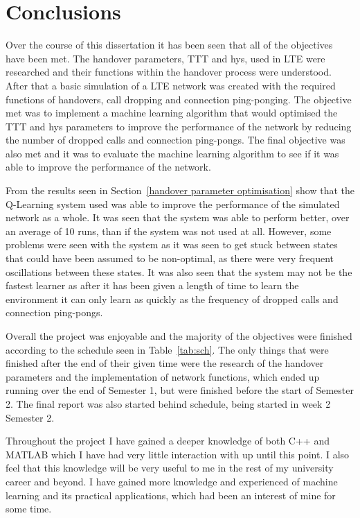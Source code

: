 \chapter{Conclusions}\label{conclusion}
Over the course of this dissertation it has been seen that all of the objectives have been met. The handover parameters, TTT and hys, used in LTE were researched and their functions within the handover process were understood. After that a basic simulation of a LTE network was created with the required functions of handovers, call dropping and connection ping-ponging. The objective met was to implement a machine learning algorithm that would optimised the TTT and hys parameters to improve the performance of the network by reducing the number of dropped calls and connection ping-pongs. The final objective was also met and it was to evaluate the machine learning algorithm to see if it was able to improve the performance of the network.

From the results seen in Section~\ref{handover parameter optimisation} show that the Q-Learning system used was able to improve the performance of the simulated network as a whole. It was seen that the system was able to perform better, over an average of 10 runs, than if the system was not used at all. However, some problems were seen with the system as it was seen to get stuck between states that could have been assumed to be non-optimal, as there were very frequent oscillations between these states. It was also seen that the system may not be the fastest learner as after it has been given a length of time to learn the environment it can only learn as quickly as the frequency of dropped calls and connection ping-pongs.

Overall the project was enjoyable and the majority of the objectives were finished according to the schedule seen in Table~\ref{tab:sch}. The only things that were finished after the end of their given time were the research of the handover parameters and the implementation of network functions, which ended up running over the end of Semester 1, but were finished before the start of Semester 2. The final report was also started behind schedule, being started in week 2 Semester 2.

Throughout the project I have gained a deeper knowledge of both C++ and MATLAB which I have had very little interaction with up until this point. I also feel that this knowledge will be very useful to me in the rest of my university career and beyond. I have gained more knowledge and experienced of machine learning and its practical applications, which had been an interest of mine for some time.
\pagebreak